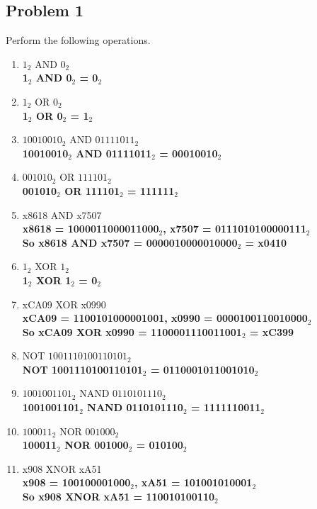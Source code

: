 \documentclass{article}
\begin{document}
\subsection*{Problem 1}
Perform the following operations. 
\begin{enumerate}[label=\alph*.]
    \item $1_2$ AND $0_2$\\
    \textbf{1$_2$ AND 0$_2$ = 0$_2$}
    \item $1_2$ OR $0_2$\\
    \textbf{1$_2$ OR 0$_2$ = 1$_2$}
    \item $10010010_2$ AND $01111011_2$\\
    \textbf{10010010$_2$ AND 01111011$_2$ = 00010010$_2$}
    \item $001010_2$ OR $111101_2$\\
    \textbf{001010$_2$ OR 111101$_2$ = 111111$_2$}
    \item x8618 AND x7507\\
    \textbf{x8618 = 1000011000011000$_2$, x7507 = 0111010100000111$_2$\\
            So x8618 AND x7507 = 0000010000010000$_2$ = x0410}
    \item $1_2$ XOR $1_2$\\
    \textbf{1$_2$ XOR 1$_2$ = 0$_2$}
    \item xCA09 XOR x0990\\
    \textbf{xCA09 = 1100101000001001, x0990 = 0000100110010000$_2$\\
            So xCA09 XOR x0990 = 1100001110011001$_2$ = xC399}
    \item NOT $1001110100110101_2$\\
    \textbf{NOT 1001110100110101$_2$ = 0110001011001010$_2$}
    \item $1001001101_2$ NAND $0110101110_2$\\
    \textbf{1001001101$_2$ NAND 0110101110$_2$ = 1111110011$_2$}
    \item $100011_2$ NOR $001000_2$\\
    \textbf{100011$_2$ NOR 001000$_2$ = 010100$_2$}
    \item x908 XNOR xA51\\
    \textbf{x908 = 100100001000$_2$, xA51 = 101001010001$_2$\\
            So x908 XNOR xA51 = 110010100110$_2$}
\end{enumerate}
\end{document}

